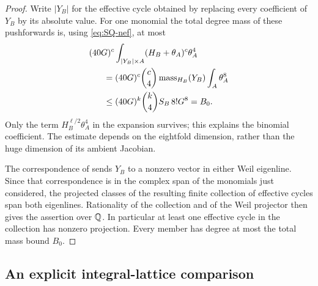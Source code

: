 \begin{proof}
Write $|Y_B|$ for the effective cycle obtained by replacing every coefficient of $Y_B$ by its absolute value. For one monomial the total degree mass of these pushforwards is, using \eqref{eq:SQ-nef}, at most
\begin{align*}
 &(40G)^c\int_{|Y_B|\times A}
                     (H_B+\theta_A)^c\theta_A^4\\
 &\hspace{6mm}=(40G)^c\binom c4
            \operatorname{mass}_{H_B}(Y_B)\int_A\theta_A^8\\
 &\hspace{6mm}\le(40G)^k\binom k4S_B\,8!G^8=B_0.
\end{align*}
Only the term $H_B^{\ell/2}\theta_A^4$ in the expansion survives; this explains the binomial coefficient. The estimate depends on the eightfold dimension, rather than the huge dimension of its ambient Jacobian.

The correspondence of  sends $Y_B$ to a nonzero vector in either Weil eigenline. Since that correspondence is in the complex span of the monomials just considered, the projected classes of the resulting finite collection of effective cycles span both eigenlines. Rationality of the collection and of the Weil projector then gives the assertion over $\mathbb Q$. In particular at least one effective cycle in the collection has nonzero projection. Every member has degree at most the total mass bound $B_0$.
\end{proof}

\subsection{An explicit integral-lattice comparison}

